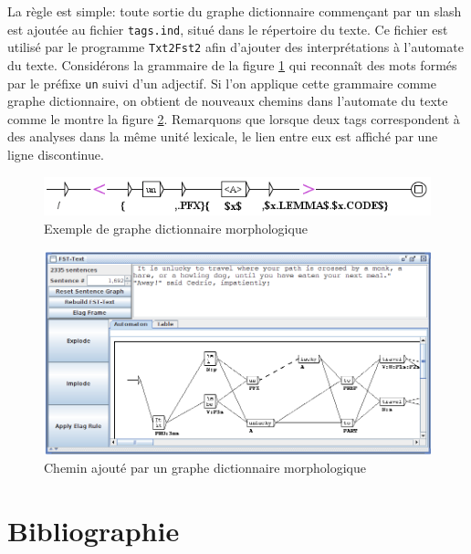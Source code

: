 \bigskip
\noindent La règle est simple: toute sortie du graphe dictionnaire commençant par un  slash 
est ajoutée au fichier \verb+tags.ind+,  situé dans le répertoire du texte.
Ce fichier est utilisé par le programme \verb+Txt2Fst2+ afin d'ajouter des interprétations à
l'automate du texte. Considérons la grammaire de la figure \ref{morphoA} qui reconnaît des mots
formés par le préfixe \verb+un+ suivi d'un adjectif. Si l'on applique cette grammaire comme graphe
dictionnaire, on obtient de nouveaux chemins dans l'automate du texte comme le montre la figure
\ref{morphoB}. Remarquons que lorsque deux tags correspondent à des analyses dans la même unité lexicale, le lien entre eux est affiché par une ligne discontinue.

\begin{figure}[!ht]
\begin{center}
\includegraphics[width=14cm]{resources/img/fig3-14a.png}
\caption{Exemple de graphe dictionnaire morphologique\label{morphoA}}
\end{center}
\end{figure}

\begin{figure}[!ht]
\begin{center}
\includegraphics[width=15cm]{resources/img/fig3-14b.png}
\caption{Chemin ajouté par un graphe dictionnaire morphologique\label{morphoB}}
\end{center}
\end{figure}

\section{Bibliographie}

